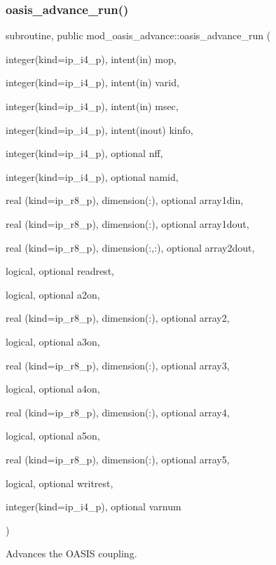 \subsubsection{\texorpdfstring{oasis\+\_\+advance\+\_\+run()}{oasis\_advance\_run()}}
{\footnotesize\ttfamily subroutine, public mod\+\_\+oasis\+\_\+advance\+::oasis\+\_\+advance\+\_\+run (\begin{DoxyParamCaption}\item[{integer(kind=ip\+\_\+i4\+\_\+p), intent(in)}]{mop,  }\item[{integer(kind=ip\+\_\+i4\+\_\+p), intent(in)}]{varid,  }\item[{integer(kind=ip\+\_\+i4\+\_\+p), intent(in)}]{msec,  }\item[{integer(kind=ip\+\_\+i4\+\_\+p), intent(inout)}]{kinfo,  }\item[{integer(kind=ip\+\_\+i4\+\_\+p), optional}]{nff,  }\item[{integer(kind=ip\+\_\+i4\+\_\+p), optional}]{namid,  }\item[{real (kind=ip\+\_\+r8\+\_\+p), dimension(\+:), optional}]{array1din,  }\item[{real (kind=ip\+\_\+r8\+\_\+p), dimension(\+:), optional}]{array1dout,  }\item[{real (kind=ip\+\_\+r8\+\_\+p), dimension(\+:,\+:), optional}]{array2dout,  }\item[{logical, optional}]{readrest,  }\item[{logical, optional}]{a2on,  }\item[{real (kind=ip\+\_\+r8\+\_\+p), dimension(\+:), optional}]{array2,  }\item[{logical, optional}]{a3on,  }\item[{real (kind=ip\+\_\+r8\+\_\+p), dimension(\+:), optional}]{array3,  }\item[{logical, optional}]{a4on,  }\item[{real (kind=ip\+\_\+r8\+\_\+p), dimension(\+:), optional}]{array4,  }\item[{logical, optional}]{a5on,  }\item[{real (kind=ip\+\_\+r8\+\_\+p), dimension(\+:), optional}]{array5,  }\item[{logical, optional}]{writrest,  }\item[{integer(kind=ip\+\_\+i4\+\_\+p), optional}]{varnum }\end{DoxyParamCaption})}



Advances the O\+A\+S\+IS coupling. 

